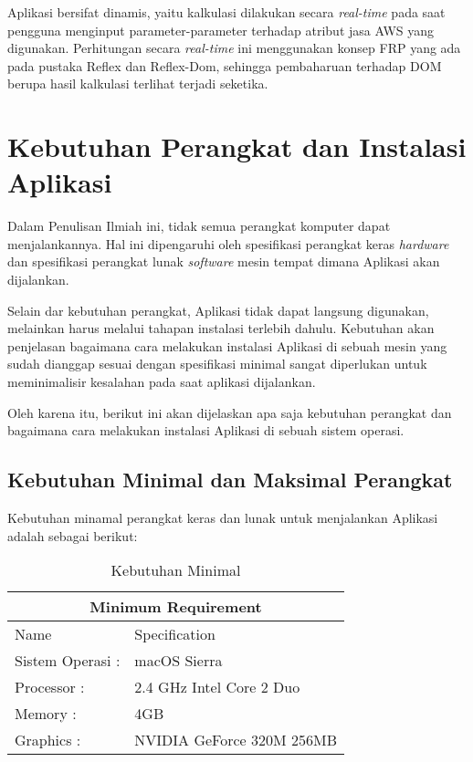 \documentclass[pi.tex]{subfile}
\begin{document}
Aplikasi bersifat dinamis, yaitu kalkulasi dilakukan secara \emph{real-time} pada saat pengguna menginput parameter-parameter terhadap atribut jasa AWS yang digunakan. Perhitungan secara \emph{real-time} ini menggunakan konsep FRP yang ada pada pustaka Reflex dan Reflex-Dom, sehingga pembaharuan terhadap DOM berupa hasil kalkulasi terlihat terjadi seketika.

\section{Kebutuhan Perangkat dan Instalasi Aplikasi}
Dalam Penulisan Ilmiah ini, tidak semua perangkat komputer dapat menjalankannya. Hal ini dipengaruhi oleh spesifikasi perangkat keras \emph{hardware} dan spesifikasi perangkat lunak \emph{software} mesin tempat dimana Aplikasi akan dijalankan.

Selain dar kebutuhan perangkat, Aplikasi tidak dapat langsung digunakan, melainkan harus melalui tahapan instalasi terlebih dahulu. Kebutuhan akan penjelasan bagaimana cara melakukan instalasi Aplikasi di sebuah mesin yang sudah dianggap sesuai dengan spesifikasi minimal sangat diperlukan untuk meminimalisir kesalahan pada saat aplikasi dijalankan.

Oleh karena itu, berikut ini akan dijelaskan apa saja kebutuhan perangkat dan bagaimana cara melakukan instalasi Aplikasi di sebuah sistem operasi.
\subsection{Kebutuhan Minimal dan Maksimal Perangkat}
Kebutuhan minamal perangkat keras dan lunak untuk menjalankan Aplikasi adalah sebagai berikut:

\begin{table}[h]
  \centering
\begin{tabular}{ |p{3cm}||p{6cm}|}
  
  \hline
  \multicolumn{2}{|c|}{Minimum Requirement} 
  \\ \hline
  Name & Specification \\
  \hline
  Sistem Operasi : & macOS Sierra \\
  Processor : & 2.4 GHz Intel Core 2 Duo \\
  Memory : & 4GB \\
  Graphics : & NVIDIA GeForce 320M 256MB \\
  \hline
  
\end{tabular}
\caption{Kebutuhan Minimal}
\end{table}
\end{document}
